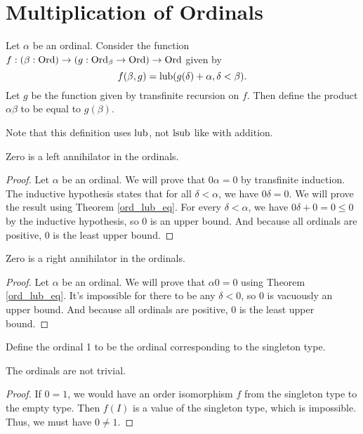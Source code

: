 \documentclass[../../math.tex]{subfiles}
\begin{document}
\section{Multiplication of Ordinals}

\begin{instance}
    Let $\alpha$ be an ordinal.  Consider the function $f : (\beta : \operatorname{Ord}) \to
    (g : \operatorname{Ord}_\beta \to \operatorname{Ord}) \to \operatorname{Ord}$ given by
    \[
        f(\beta, g) = \operatorname{lub}(g(\delta) + \alpha, \delta < \beta).
    \]
    Let $g$ be the function given by transfinite recursion on $f$.  Then define
    the product $\alpha \beta$ to be equal to $g(\beta)$.
\end{instance}

Note that this definition uses $\operatorname{lub}$, not $\operatorname{lsub}$ like with addition.

\begin{instance}
    Zero is a left annihilator in the ordinals.
\end{instance}
\begin{proof}
    Let $\alpha$ be an ordinal.  We will prove that $0\alpha = 0$ by transfinite
    induction.  The inductive hypothesis states that for all $\delta < \alpha$,
    we have $0\delta = 0$.  We will prove the result using Theorem
    \ref{ord_lub_eq}.  For every $\delta < \alpha$, we have $0\delta + 0 = 0
    \leq 0$ by the inductive hypothesis, so $0$ is an upper bound.  And because
    all ordinals are positive, $0$ is the least upper bound.
\end{proof}

\begin{instance}
    Zero is a right annihilator in the ordinals.
\end{instance}
\begin{proof}
    Let $\alpha$ be an ordinal.  We will prove that $\alpha 0 = 0$ using Theorem
    \ref{ord_lub_eq}.  It's impossible for there to be any $\delta < 0$, so $0$
    is vacuously an upper bound. And because all ordinals are positive, $0$ is
    the least upper bound.
\end{proof}

\begin{instance}
    Define the ordinal 1 to be the ordinal corresponding to the singleton type.
\end{instance}

\begin{instance} \label{ord_not_trivial}
    The ordinals are not trivial.
\end{instance}
\begin{proof}
    If $0 = 1$, we would have an order isomorphism $f$ from the singleton type
    to the empty type.  Then $f(I)$ is a value of the singleton type, which is
    impossible.  Thus, we must have $0 \neq 1$.
\end{proof}
\end{document}
